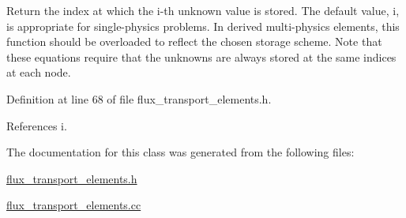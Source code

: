 Return the index at which the i-\/th unknown value is stored. The default value, i, is appropriate for single-\/physics problems. In derived multi-\/physics elements, this function should be overloaded to reflect the chosen storage scheme. Note that these equations require that the unknowns are always stored at the same indices at each node. 



Definition at line 68 of file flux\+\_\+transport\+\_\+elements.\+h.



References i.



The documentation for this class was generated from the following files\+:\begin{DoxyCompactItemize}
\item 
\hyperlink{flux__transport__elements_8h}{flux\+\_\+transport\+\_\+elements.\+h}\item 
\hyperlink{flux__transport__elements_8cc}{flux\+\_\+transport\+\_\+elements.\+cc}\end{DoxyCompactItemize}
